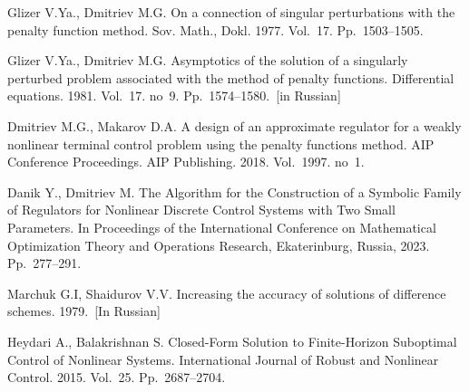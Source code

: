\documentclass[12pt]{llncs}
\begin{document}
\begin{thebibliography}{9} %

 Glizer V.Ya., Dmitriev M.G. On a connection of singular perturbations with the penalty function method. Sov. Math., Dokl. 1977. Vol.~17. Pp.~1503--1505.

 Glizer V.Ya., Dmitriev M.G. Asymptotics of the solution of a singularly perturbed problem associated with the method of penalty functions. Differential equations. 1981. Vol.~17. no~9. Pp.~1574--1580.~[in Russian]

 Dmitriev M.G., Makarov D.A. A design of an approximate regulator for a weakly nonlinear terminal control problem using the penalty functions method. AIP Conference Proceedings. AIP Publishing. 2018. Vol.~1997. no~1.

 Danik Y., Dmitriev M. The Algorithm for the Construction of a Symbolic Family of Regulators for Nonlinear Discrete Control Systems with Two Small Parameters. In Proceedings of the International Conference on Mathematical Optimization Theory and Operations Research, Ekaterinburg, Russia, 2023. Pp.~277--291.

  Marchuk G.I, Shaidurov V.V. Increasing the accuracy of solutions of difference schemes. 1979.~[In Russian]

 Heydari A., Balakrishnan S. Closed-Form Solution to Finite-Horizon Suboptimal Control of Nonlinear Systems. International Journal of Robust and Nonlinear Control. 2015. Vol.~25. Pp.~2687--2704.




%

\end{thebibliography}
\end{document}
